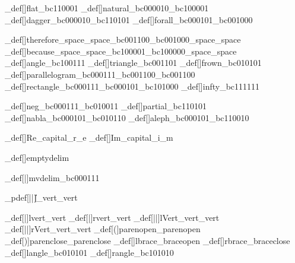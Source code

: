 \brl@char_def[]{flat}{\brl@char_bc110001}
\brl@char_def[]{natural}{\brl@char_bc000010\brl@char_bc100001}
\brl@char_def[]{dagger}{\brl@char_bc000010\brl@char_bc110101}
\brl@char_def[]{forall}{\brl@char_bc000101\brl@char_bc001000}

\brl@char_def[]{therefore}{\brl@char@alias_space\brl@char@alias_space\brl@char_bc001100\brl@char_bc001000\brl@char@alias_space\brl@char@alias_space}
\brl@char_def[]{because}{\brl@char@alias_space\brl@char@alias_space\brl@char_bc100001\brl@char_bc100000\brl@char@alias_space\brl@char@alias_space}
\brl@char_def[]{angle}{\brl@char_bc100111}
\brl@char_def[]{triangle}{\brl@char_bc001101}
\brl@char_def[]{frown}{\brl@char_bc010101}
\brl@char_def[\brl@orig@parallelogram]{parallelogram}{\brl@char_bc000111\brl@char_bc001100\brl@char_bc001100}
\brl@char_def[\brl@orig@rectangle]{rectangle}{\brl@char_bc000111\brl@char_bc000101\brl@char_bc101000}
\brl@char_def[]{infty}{\brl@char_bc111111}



\brl@char_def[]{neg}{\brl@char_bc000111\brl@char_bc010011}
\brl@char_def[]{partial}{\brl@char_bc110101}
\brl@char_def[]{nabla}{\brl@char_bc000101\brl@char_bc010110}
\brl@char_def[]{aleph}{\brl@char_bc000101\brl@char_bc110010}


\brl@char_def[]{Re}{\brl@char@alias_capital\brl@char@alias_r\brl@char@alias_e}
\brl@char_def[]{Im}{\brl@char@alias_capital\brl@char@alias_i\brl@char@alias_m}



\brl@char_def[]{emptydelim}{}%

\brl@char_def[|]{mvdelim}{\brl@char_bc000111}%

\brl@char_pdef[||]{\|}{\brl@char@alias_vert\brl@char@alias_vert}%

\brl@char_def[|]{lvert}{\brl@char@alias_vert}%
\brl@char_def[|]{rvert}{\brl@char@alias_vert}%
\brl@char_def[||]{lVert}{\brl@char@alias_vert\brl@char@alias_vert}%
\brl@char_def[||]{rVert}{\brl@char@alias_vert\brl@char@alias_vert}%
\brl@char_def[(]{parenopen}{\brl@char@alias_parenopen}
\brl@char_def[)]{parenclose}{\brl@char@alias_parenclose}
\brl@char_def[]{lbrace}{\brl@char@alias_braceopen}
\brl@char_def[]{rbrace}{\brl@char@alias_braceclose}
\brl@char_def[]{langle}{\brl@char_bc010101}
\brl@char_def[]{rangle}{\brl@char_bc101010}


